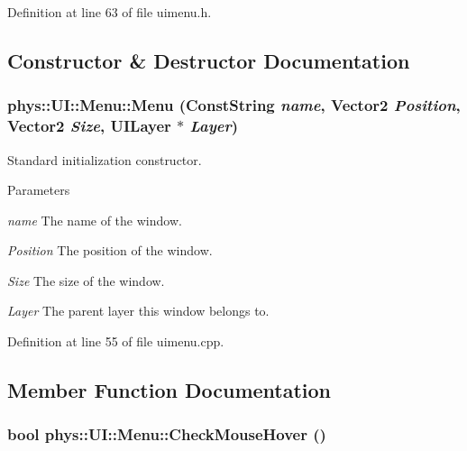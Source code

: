 Definition at line 63 of file uimenu.h.



\subsection{Constructor \& Destructor Documentation}
\hypertarget{classphys_1_1UI_1_1Menu_a1ac37cef302ff52d80218bc2cceb30ba}{
\subsubsection[{Menu}]{\setlength{\rightskip}{0pt plus 5cm}phys::UI::Menu::Menu ({\bf ConstString} {\em name}, \/  {\bf Vector2} {\em Position}, \/  {\bf Vector2} {\em Size}, \/  {\bf UILayer} $\ast$ {\em Layer})}}
\label{d6/dd3/classphys_1_1UI_1_1Menu_a1ac37cef302ff52d80218bc2cceb30ba}


Standard initialization constructor. 


\begin{DoxyParams}{Parameters}
\item[{\em name}]The name of the window. \item[{\em Position}]The position of the window. \item[{\em Size}]The size of the window. \item[{\em Layer}]The parent layer this window belongs to. \end{DoxyParams}


Definition at line 55 of file uimenu.cpp.



\subsection{Member Function Documentation}
\hypertarget{classphys_1_1UI_1_1Menu_af2514d2614322856f604be2e167d0872}{
\subsubsection[{CheckMouseHover}]{\setlength{\rightskip}{0pt plus 5cm}bool phys::UI::Menu::CheckMouseHover ()}}
\label{d6/dd3/classphys_1_1UI_1_1Menu_af2514d2614322856f604be2e167d0872}


